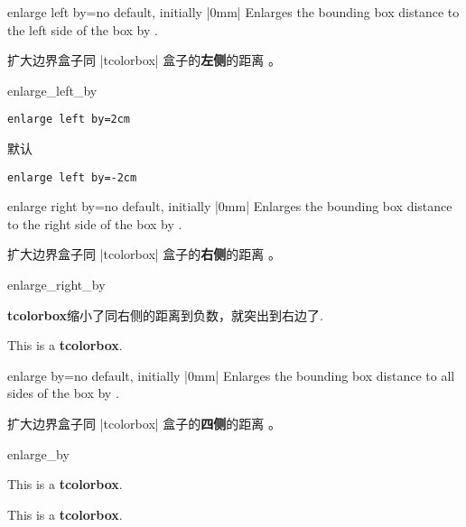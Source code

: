\begin{docTcbKey}{enlarge left by}{=}{no default, initially |0mm|}
Enlarges the bounding box distance to the left side of the box by .

扩大边界盒子同 |tcolorbox| 盒子的{\bf 左侧}的距离 。
\begin{exdispExample}[safety=2cm]{enlarge_left_by}

\begin{tcolorbox}[enlarge left by=2cm,width=5cm,enhanced,show bounding box]
\verb|enlarge left by=2cm|
\end{tcolorbox}
\begin{tcolorbox}[width=5cm,enhanced,show bounding box]
默认
\end{tcolorbox}
\begin{tcolorbox}[enlarge left by=-2cm,width=\linewidth+2cm,show bounding box]
\verb|enlarge left by=-2cm|
\end{tcolorbox}
\end{exdispExample}
\end{docTcbKey}

\begin{docTcbKey}{enlarge right by}{=}{no default, initially |0mm|}
Enlarges the bounding box distance to the right side of the box by .

扩大边界盒子同 |tcolorbox| 盒子的{\bf 右侧}的距离 。
\begin{exdispExample}[safety=2cm]{enlarge_right_by}

\begin{tcolorbox}[enlarge right by=-2cm,width=\linewidth+2cm,
enhanced,show bounding box]
\textbf{tcolorbox}缩小了同右侧的距离到负数，就突出到右边了.
\end{tcolorbox}
\begin{tcolorbox}[enlarge right by=2cm,width=\linewidth-2cm]
This is a \textbf{tcolorbox}.
\end{tcolorbox}
\end{exdispExample}
\end{docTcbKey}




\begin{docTcbKey}{enlarge by}{=}{no default, initially |0mm|}
Enlarges the bounding box distance to all sides of the box by .

扩大边界盒子同 |tcolorbox| 盒子的{\bf 四侧}的距离 。
\begin{exdispExample}{enlarge_by}

\begin{tcolorbox}
This is a \textbf{tcolorbox}.
\end{tcolorbox}
\begin{tcolorbox}[enlarge by=5mm,enhanced,show bounding box]
This is a \textbf{tcolorbox}.
\end{tcolorbox}
\end{exdispExample}
\end{docTcbKey}





